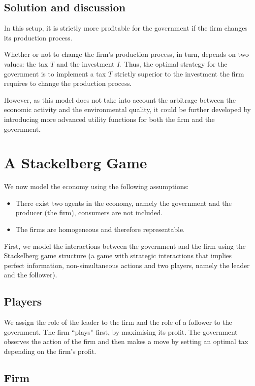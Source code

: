 \documentclass{article}
\begin{document}
\subsection{Solution and discussion}

In this setup, it is strictly more profitable for the government if the firm changes its production process. 

Whether or not to change the firm's production process, in turn, depends on two values: the tax $T$ and the investment $I$.
Thus, the optimal strategy for the government is to implement a tax $T$ strictly superior to the investment the firm requires to change the production process. 

However, as this model does not take into account the arbitrage between the economic activity and the environmental quality, it could be further developed by introducing more advanced utility functions for both the firm and the government.

\pagebreak
\section{A Stackelberg Game}

We now model the economy using the following assumptions: 
\begin{itemize}
    \item There exist two agents in the economy, namely the government and the producer (the firm), consumers are not included.
    \item The firms are homogeneous and therefore representable. 
\end{itemize} 

First, we model the interactions between the government and the firm using the Stackelberg game structure (a game with strategic interactions that implies perfect information, non-simultaneous actions and two players, namely the leader and the follower). 

\subsection{Players}
We assign the role of the leader to the firm and the role of a follower to the government. The firm  “plays” first, by maximising its profit. The government observes the action of the firm and then makes a move by setting an optimal tax depending on the firm's profit. \\

\subsection{Firm}
\end{document}
